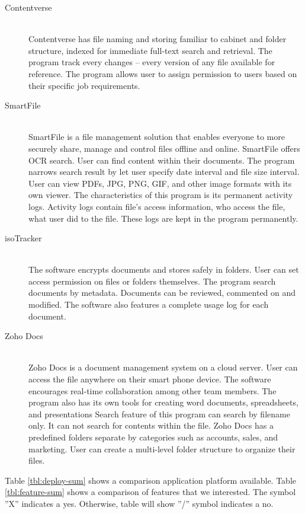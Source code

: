 \begin{description}
\item[Contentverse] \hfill \\
Contentverse has file naming and storing familiar to cabinet and folder structure, indexed for immediate full-text search and retrieval.
The program track every changes -- every version of any file available for reference.
The program allows user to assign permission to users based on their specific job requirements.

\item[SmartFile] \hfill \\
SmartFile is a file management solution that enables everyone to more securely share, manage and control files offline and online.
SmartFile offers \gls{OCR} search.
User can find content within their documents.
The program narrows search result by let user specify date interval and file size interval.
User can view PDFs, JPG, PNG, GIF, and other image formats with its own viewer.
The characteristics of this program is its permanent activity logs.
Activity logs contain file's access information, who access the file, what user did to the file.
These logs are kept in the program permanently.

\item[isoTracker] \hfill \\
The software encrypts documents and stores safely in folders.
User can set access permission on files or folders themselves.
The program search documents by metadata.
Documents can be reviewed, commented on and modified. The software also features a complete usage log for each document.

\item[Zoho Docs] \hfill \\
Zoho Docs is a document management system on a cloud server.
User can access the file anywhere on their smart phone device.
The software encourages real-time collaboration among other team members.
The program also has its own tools for creating word documents, spreadsheets, and presentations
Search feature of this program can search by filename only.
It can not search for contents within the file.
Zoho Docs has a predefined folders separate by categories such as accounts, sales, and marketing.
User can create a multi-level folder structure to organize their files.
\end{description}

Table \ref{tbl:deploy-sum} shows a comparison application platform available.
Table \ref{tbl:feature-sum} shows a comparison of features that we interested.
The symbol ''X'' indicates a yes.
Otherwise, table will show ''/'' symbol indicates a no.

